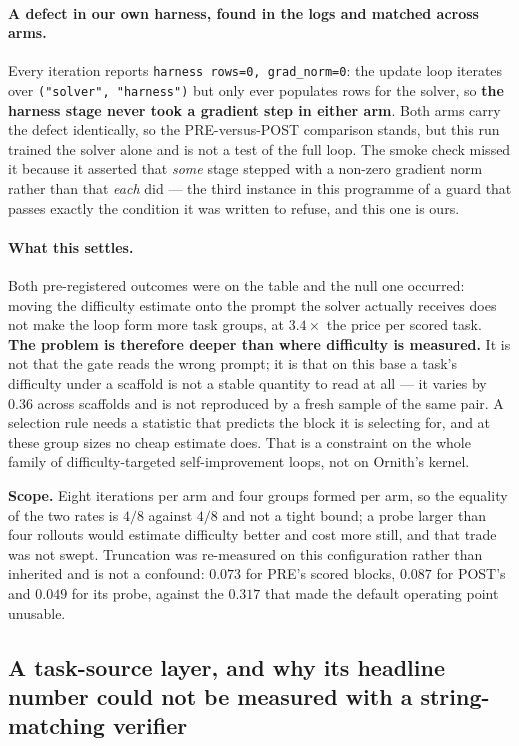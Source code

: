 \paragraph{A defect in our own harness, found in the logs and matched across arms.}
Every iteration reports \texttt{harness rows=0, grad\_norm=0}: the update loop iterates over
\texttt{("solver", "harness")} but only ever populates rows for the solver, so \textbf{the
harness stage never took a gradient step in either arm}. Both arms carry the defect identically,
so the PRE-versus-POST comparison stands, but this run trained the solver alone and is not a
test of the full loop. The smoke check missed it because it asserted that \emph{some} stage
stepped with a non-zero gradient norm rather than that \emph{each} did --- the third instance in
this programme of a guard that passes exactly the condition it was written to refuse, and this
one is ours.

\paragraph{What this settles.} Both pre-registered outcomes were on the table and the null one
occurred: moving the difficulty estimate onto the prompt the solver actually receives does not
make the loop form more task groups, at $3.4\times$ the price per scored task. \textbf{The
problem is therefore deeper than where difficulty is measured.} It is not that the gate reads
the wrong prompt; it is that on this base a task's difficulty under a scaffold is not a stable
quantity to read at all --- it varies by $0.36$ across scaffolds and is not reproduced by a
fresh sample of the same pair. A selection rule needs a statistic that predicts the block it is
selecting for, and at these group sizes no cheap estimate does. That is a constraint on the
whole family of difficulty-targeted self-improvement loops, not on Ornith's kernel.

\textbf{Scope.} Eight iterations per arm and four groups formed per arm, so the equality of the
two rates is $4/8$ against $4/8$ and not a tight bound; a probe larger than four rollouts would
estimate difficulty better and cost more still, and that trade was not swept. Truncation was
re-measured on this configuration rather than inherited and is not a confound: $0.073$ for
PRE's scored blocks, $0.087$ for POST's and $0.049$ for its probe, against the $0.317$ that
made the default operating point unusable.

\subsection{A task-source layer, and why its headline number could not be measured with a
string-matching verifier}
\label{sec:tasksource}

